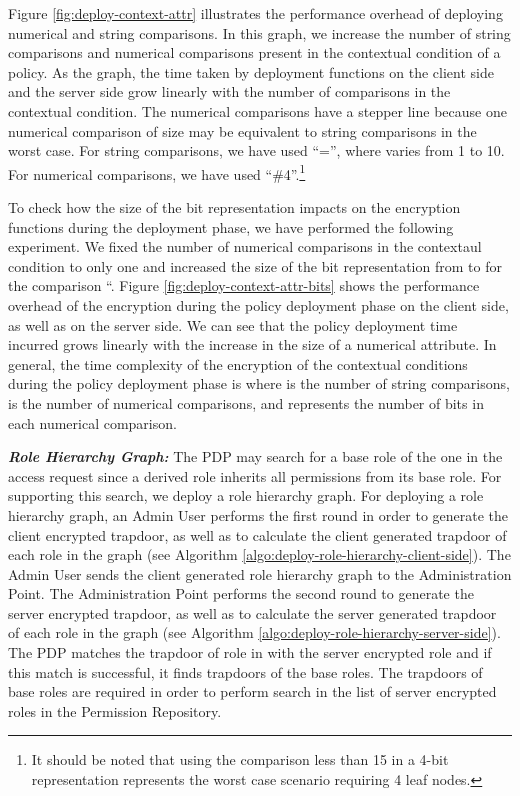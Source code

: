 \documentclass[final,5p,times,twocolumn]{elsarticle}
\begin{document}
Figure \ref{fig:deploy-context-attr} illustrates the performance overhead of deploying numerical and string comparisons. In this graph, we increase the number of string comparisons and numerical comparisons present in the contextual condition of a policy. As the graph, the time taken by deployment functions on the client side and the server side grow linearly with the number of comparisons in the contextual condition. The numerical comparisons have a stepper line because one numerical comparison of size  may be equivalent to  string comparisons in the worst case. For string comparisons, we have used ``='', where  varies from 1 to 10. For numerical comparisons, we have used ``\#4''.\footnote{It should be noted that using the comparison less than 15 in a 4-bit representation represents the worst case scenario requiring 4 leaf nodes.}

To check how the size of the bit representation impacts on the encryption functions during the deployment phase, we have performed the following experiment. We fixed the number of numerical comparisons in the contextaul condition to only one and increased the size  of the bit representation from  to  for the comparison ``. Figure \ref{fig:deploy-context-attr-bits} shows the performance overhead of the encryption during the policy deployment phase on the client side, as well as on the server side. We can see that the policy deployment time incurred grows linearly with the increase in the size  of a numerical attribute. In general, the time complexity of the encryption of the contextual conditions during the policy deployment phase is  where  is the number of string comparisons,  is the number of numerical comparisons, and  represents the number of bits in each numerical comparison.


\emph{\textbf{Role Hierarchy Graph:}} 
The PDP may search for a base role of the one in the access request  since a derived role inherits all permissions from its base role. For supporting this search, we deploy a role hierarchy graph. For deploying a role hierarchy graph, an Admin User performs the first round in order to generate the client encrypted trapdoor, as well as to calculate the client generated trapdoor of each role in the graph (see Algorithm \ref{algo:deploy-role-hierarchy-client-side}). The Admin User sends the client generated role hierarchy graph to the Administration Point. The Administration Point performs the second round to generate the server encrypted trapdoor, as well as to calculate the server generated trapdoor of each role in the graph (see Algorithm \ref{algo:deploy-role-hierarchy-server-side}). The PDP matches the trapdoor of role in  with the server encrypted role and if this match is successful, it finds trapdoors of the base roles. The trapdoors of base roles are required in order to perform search in the list of server encrypted roles in the Permission Repository.
\end{document}
